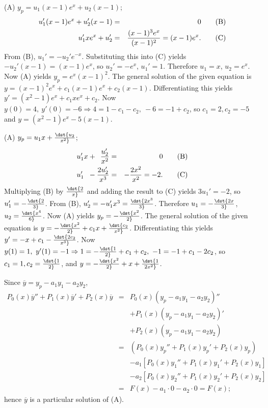\documentclass[dvips]{book}
\renewcommand{\exer}[1]{\par\medskip\;\noindent{\color{red}\bf #1.}}
\numberwithin{example}{section}
\numberwithin{equation}{section}
\numberwithin{theorem}{section}
\numberwithin{table}{section}
\numberwithin{figure}{section}
\begin{document}
\exer{5.7.32}
(A) $y_p=u_1(x-1)e^x+u_2(x-1)$;
\setcounter{equation}{1}
\begin{eqnarray*}
u_1'(x-1)e^x+u_2'(x-1)&=&0 \qquad\text{(B)}
\\ %
u_1'xe^x+u_2'&=&{(x-1)^3e^x\over(x-1)^2}=(x-1)e^x. \qquad\text{(C)}
\end{eqnarray*}
From (B), $u_1'=-u_2'e^{-x}$. Substituting this into
(C) yields $-u_2'(x-1)=(x-1)e^x$, so $u_2'=-e^x$,
$u_1'=1$. Therefore $u_1=x$, $u_2=e^x$. Now (A) yields
$y_p=e^x(x-1)^2$. The general solution of the given equation is
$y=(x-1)^2e^x+c_1(x-1)e^x+c_2(x-1)$. Differentiating this yields
$y'=(x^2-1)e^x+c_1xe^x+c_2$. Now $y(0)=4,\ y'(0)=-6\Rightarrow
4=1-c_1-c_2,\ -6=-1+c_2$, so $c_1=2, c_2=-5$ and
$y=(x^2-1)e^x-5(x-1)$.


\exer{5.7.34}
(A) $y_p=u_1x+\dst{u_2\over x^2}$;
\setcounter{equation}{1}
\begin{eqnarray*}
u_1'x+\phantom{2}{u_2'\over x^2}&=&0\qquad\text{(B)}\\ %
u_1'\phantom{x}-{2u_2'\over x^3}&=&-{2x^2\over
x^2}=-2.\qquad\text{(C)} %
\end{eqnarray*}
Multiplying (B) by $\dst{2\over x}$ and adding the
result to (C) yields $3u_1'=-2$, so
$u_1'=-\dst{2\over3}$. From (B),
$u_2'=-u_1'x^3=\dst{2x^3\over3}$. Therefore $u_1=-\dst{2x\over3}$,
$u_2=\dst{x^4\over6}$. Now (A) yields $y_p=-\dst{x^2\over2}$. The
general solution of the given equation is
$y=-\dst{x^2\over2}+c_1x+\dst{c_2\over x^2}$. Differentiating this
yields $y'=-x+c_1-\dst{2c_2\over x^3}$. Now $y(1)=1,\
y'(1)=-1\Rightarrow 1=-\dst{1\over2}+c_1+c_2,\ -1=-1+c_1-2c_2$, so
$c_1=1, c_2=\dst{1\over2}$, and
$y=-\dst{x^2\over2}+x+\dst{1\over2x^2}$.




\exer{5.7.36}
Since $\overline y=y_p-a_1y_1-a_2y_2$,
\begin{eqnarray*}
P_0(x)\overline y''+P_1(x)\overline y'+P_2(x)\overline y&=&
P_0(x)(y_p-a_1y_1-a_2y_2)''\\ &&+P_1(x)(y_p-a_1y_1-a_2y_2)'\\ &&+
P_2(x)(y_p-a_1y_1-a_2y_2)\\ &=&
(P_0(x)y_p''+P_1(x)y_p'+P_2(x)y_p)\\ &&
-a_1\left[P_0(x)y_1''+P_1(x)y_1'+P_2(x)y_1\right]\\ &&
-a_2\left[P_0(x)y_2''+P_1(x)y_2'+P_2(x)y_2\right]\\
&=&F(x)-a_1\cdot0-a_2\cdot0=F(x);
\end{eqnarray*}
 hence $\overline y$
is a particular solution of (A).
\end{document}
